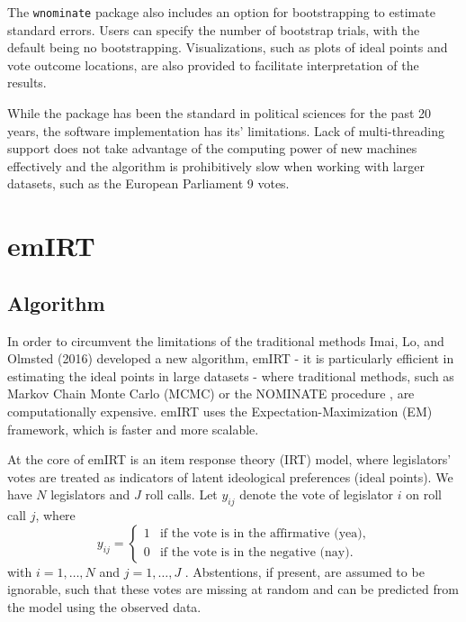 \documentclass[a4paper,12pt]{report}
\begin{document}
    The \texttt{wnominate}
    package also includes an option for bootstrapping to estimate standard errors. Users can specify
    the number of bootstrap trials, with the default being no bootstrapping. Visualizations, such as
    plots of ideal points and vote outcome locations, are also provided to facilitate interpretation
    of the results.

    While the package has been the standard in political sciences for the past 20 years, the software
    implementation has its' limitations. Lack of multi-threading support does not take advantage of the
    computing power of new machines effectively and the algorithm is prohibitively slow when working
    with larger datasets, such as the European Parliament 9 votes.


    \section{emIRT}

    \subsection{Algorithm}
    In order to circumvent the limitations of the traditional methods Imai, Lo, and Olmsted (2016) developed
    a
    new algorithm, emIRT - it is particularly efficient in estimating the ideal points in large datasets -
    where
    traditional methods, such as Markov Chain Monte Carlo
    (MCMC) or the NOMINATE procedure , are computationally expensive. emIRT uses the
    Expectation-Maximization (EM) framework, which is faster and more scalable.

    At the core of emIRT is an item response theory (IRT) model, where legislators' votes are treated as
    indicators of latent ideological preferences (ideal points).
    We have \( N \) legislators and \( J \) roll calls. Let \( y_{ij} \) denote the vote of legislator \( i \)
    on roll call \( j \), where
    \[
        y_{ij} =
        \begin{cases}
            1 & \text{if the vote is in the affirmative (yea)}, \\
            0 & \text{if the vote is in the negative (nay)}.
        \end{cases}
    \]
    with \( i = 1, \dots, N \) and \( j = 1, \dots, J \)
    . Abstentions, if present, are assumed to be ignorable, such that these votes are missing at random and can be
    predicted from the model using the observed data.
\end{document}
